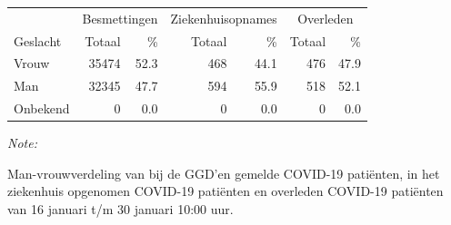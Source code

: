 \documentclass[
  english,
  man,floatsintext]{apa6}
\begin{document}
\begin{table}[H]
\centering\begingroup\fontsize{11}{13}\selectfont

\begin{threeparttable}
\begin{tabular}{lrrrrrr}
\toprule
\multicolumn{1}{c}{ } & \multicolumn{2}{c}{Besmettingen} & \multicolumn{2}{c}{Ziekenhuisopnames} & \multicolumn{2}{c}{Overleden} \\
\cmidrule(l{3pt}r{3pt}){2-3} \cmidrule(l{3pt}r{3pt}){4-5} \cmidrule(l{3pt}r{3pt}){6-7}
Geslacht & Totaal & \% & Totaal & \% & Totaal & \%\\
\midrule
Vrouw & 35474 & 52.3 & 468 & 44.1 & 476 & 47.9\\
Man & 32345 & 47.7 & 594 & 55.9 & 518 & 52.1\\
Onbekend & 0 & 0.0 & 0 & 0.0 & 0 & 0.0\\
\bottomrule
\end{tabular}
\begin{tablenotes}
\item \textit{Note: } 
\item Man-vrouwverdeling van bij de GGD’en gemelde COVID-19 patiënten, in het ziekenhuis opgenomen COVID-19 patiënten en overleden COVID-19 patiënten van 16 januari t/m 30 januari 10:00 uur.
\end{tablenotes}
\end{threeparttable}
\endgroup{}
\end{table}
\newpage
\end{document}
